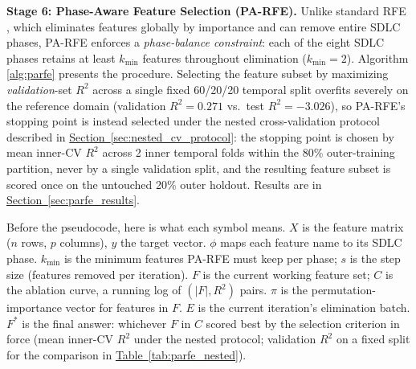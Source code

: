 \documentclass[technologies,article,submit,pdftex,moreauthors]{Definitions/mdpi}
\begin{document}
\textbf{Stage 6: Phase-Aware Feature Selection (PA-RFE).} Unlike standard RFE \citep{guyon2002}, which eliminates features globally by importance and can remove entire SDLC phases, PA-RFE enforces a \emph{phase-balance constraint}: each of the eight SDLC phases retains at least \(k_{\min}\) features throughout elimination (\(k_{\min} = 2\)). Algorithm \ref{alg:parfe} presents the procedure. Selecting the feature subset by maximizing \emph{validation}-set \(R^2\) across a single fixed 60/20/20 temporal split overfits severely on the reference domain (validation \(R^2=0.271\) vs.~test \(R^2=-3.026\)), so PA-RFE's stopping point is instead selected under the nested cross-validation protocol described in \hyperref[sec:nested_cv_protocol]{Section~\ref*{sec:nested_cv_protocol}}: the stopping point is chosen by mean inner-CV \(R^2\) across 2 inner temporal folds within the 80\% outer-training partition, never by a single validation split, and the resulting feature subset is scored once on the untouched 20\% outer holdout. Results are in \hyperref[sec:parfe_results]{Section~\ref*{sec:parfe_results}}.

Before the pseudocode, here is what each symbol means. \(X\) is the feature matrix (\(n\) rows, \(p\) columns), \(y\) the target vector. \(\phi\) maps each feature name to its SDLC phase. \(k_{\min}\) is the minimum features PA-RFE must keep per phase; \(s\) is the step size (features removed per iteration). \(F\) is the current working feature set; \(C\) is the ablation curve, a running log of \((|F|, R^2)\) pairs. \(\pi\) is the permutation-importance vector for features in \(F\). \(E\) is the current iteration's elimination batch. \(F^*\) is the final answer: whichever \(F\) in \(C\) scored best by the selection criterion in force (mean inner-CV \(R^2\) under the nested protocol; validation \(R^2\) on a fixed split for the comparison in \hyperref[tab:parfe_nested]{Table~\ref*{tab:parfe_nested}}).
\end{document}
